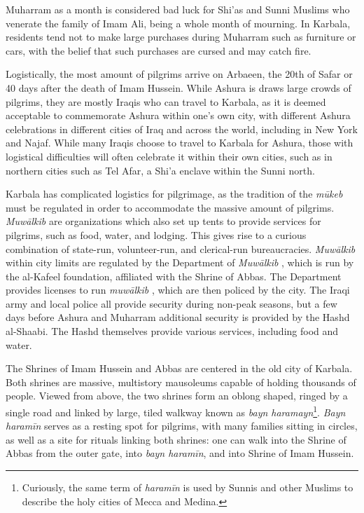 
Muharram as a month is considered bad luck for Shi'as and Sunni Muslims who venerate the family of Imam Ali, being a whole month of mourning. In Karbala, residents tend not to make large purchases during Muharram such as furniture or cars, with the belief that such purchases are cursed and may catch fire. 

Logistically, the most amount of pilgrims arrive on Arbaeen, the 20th of Safar or 40 days after the death of Imam Hussein. While Ashura is draws large crowds of pilgrims, they are mostly Iraqis who can travel to Karbala, as it is deemed acceptable to commemorate Ashura within one’s own city, with different Ashura celebrations in different cities of Iraq and across the world, including in New York and Najaf. While many Iraqis choose to travel to Karbala for Ashura, those with logistical difficulties will often celebrate it within their own cities, such as in northern cities such as Tel Afar, a Shi'a enclave within the Sunni north.  

Karbala has complicated logistics for pilgrimage, as the tradition of the \emph{mūkeb} must be regulated in order to accommodate the massive amount of pilgrims. \emph{Muwālkib}  are organizations which also set up tents to provide services for pilgrims, such as food, water, and lodging. This gives rise to a curious combination of state-run, volunteer-run, and clerical-run bureaucracies. \emph{Muwālkib}  within city limits are regulated by the Department of \emph{Muwālkib} , which is run by the al-Kafeel foundation, affiliated with the Shrine of Abbas. The Department provides licenses to run \emph{muwālkib} , which are then policed by the city. The Iraqi army and local police all provide security during non-peak seasons, but a few days before Ashura and Muharram additional security is provided by the Hashd al-Shaabi. The Hashd themselves provide various services, including food and water.

The Shrines of Imam Hussein and Abbas are centered in the old city of Karbala. Both shrines are massive, multistory mausoleums capable of holding thousands of people. Viewed from above, the two shrines form an oblong shaped, ringed by a single road and linked by large, tiled walkway known as \emph{bayn haramayn}\footnote{Curiously, the same term of \emph{haramīn} is used by Sunnis and other Muslims to describe the holy cities of Mecca and Medina.}. \emph{Bayn haramīn} serves as a resting spot for pilgrims, with many families sitting in circles, as well as a site for rituals linking both shrines: one can walk into the Shrine of Abbas from the outer gate, into \emph{bayn haramīn}, and into Shrine of Imam Hussein. 

